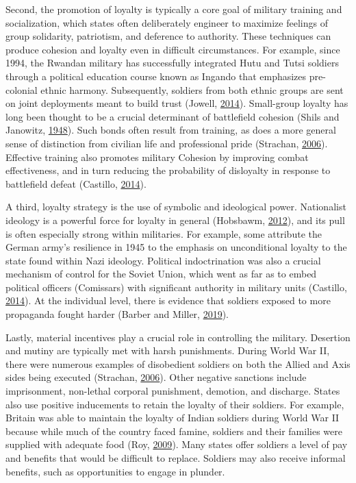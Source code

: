 \documentclass[
  12pt,
]{article}
\begin{document}
Second, the promotion of loyalty is typically a core goal of military training and socialization, which states often deliberately engineer to maximize feelings of group solidarity, patriotism, and deference to authority. These techniques can produce cohesion and loyalty even in difficult circumstances. For example, since 1994, the Rwandan military has successfully integrated Hutu and Tutsi soldiers through a political education course known as Ingando that emphasizes pre-colonial ethnic harmony. Subsequently, soldiers from both ethnic groups are sent on joint deployments meant to build trust (Jowell, \protect\hyperlink{ref-Jowell2014}{2014}). Small-group loyalty has long been thought to be a crucial determinant of battlefield cohesion (Shils and Janowitz, \protect\hyperlink{ref-Shils1948}{1948}). Such bonds often result from training, as does a more general sense of distinction from civilian life and professional pride (Strachan, \protect\hyperlink{ref-Strachan2006}{2006}). Effective training also promotes military Cohesion by improving combat effectiveness, and in turn reducing the probability of disloyalty in response to battlefield defeat (Castillo, \protect\hyperlink{ref-Castillo2014}{2014}).

A third, loyalty strategy is the use of symbolic and ideological power. Nationalist ideology is a powerful force for loyalty in general (Hobsbawm, \protect\hyperlink{ref-Hobsbawm2012}{2012}), and its pull is often especially strong within militaries. For example, some attribute the German army's resilience in 1945 to the emphasis on unconditional loyalty to the state found within Nazi ideology. Political indoctrination was also a crucial mechanism of control for the Soviet Union, which went as far as to embed political officers (Comissars) with significant authority in military units (Castillo, \protect\hyperlink{ref-Castillo2014}{2014}). At the individual level, there is evidence that soldiers exposed to more propaganda fought harder (Barber and Miller, \protect\hyperlink{ref-Barber2019}{2019}).

Lastly, material incentives play a crucial role in controlling the military. Desertion and mutiny are typically met with harsh punishments. During World War II, there were numerous examples of disobedient soldiers on both the Allied and Axis sides being executed (Strachan, \protect\hyperlink{ref-Strachan2006}{2006}). Other negative sanctions include imprisonment, non-lethal corporal punishment, demotion, and discharge. States also use positive inducements to retain the loyalty of their soldiers. For example, Britain was able to maintain the loyalty of Indian soldiers during World War II because while much of the country faced famine, soldiers and their families were supplied with adequate food (Roy, \protect\hyperlink{ref-Roy2009}{2009}). Many states offer soldiers a level of pay and benefits that would be difficult to replace. Soldiers may also receive informal benefits, such as opportunities to engage in plunder.
\end{document}
